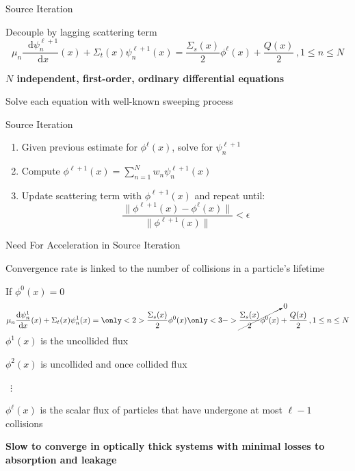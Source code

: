 \documentclass[10pt]{beamer}
\newcommand{\ud}{\mathop{}\!\mathrm{d}} %
\newcommand{\dderiv}[2]{\frac{\ud #1}{\ud #2}}
\begin{document}
\begin{frame}{Source Iteration}

    Decouple by lagging scattering term 
    \begin{equation*}
        \mu_n \dderiv{\psi_n^{\ell+1}}{x}(x) + \Sigma_t(x) \psi_n^{\ell+1}(x) = 
        \frac{\Sigma_s(x)}{2} \phi^{\ell}(x) + \frac{Q(x)}{2} \,, 1 \leq n \leq N        
    \end{equation*}

    \textbf{$N$ independent, first-order, ordinary differential equations}

    Solve each equation with well-known sweeping process 

    \begin{exampleblock}{Source Iteration}
    \begin{enumerate}
        \item Given previous estimate for $\phi^{\ell}(x)$, solve for $\psi_n^{\ell+1}$

        \item Compute $\phi^{\ell+1}(x) = 
            \sum_{n=1}^N w_n \psi_n^{\ell+1}(x)$ 

        \item Update scattering term with $\phi^{\ell+1}(x)$ and repeat until: 
             \begin{equation*}
                \frac{\|\phi^{\ell+1}(x) - \phi^{\ell}(x)\|}{\|\phi^{\ell+1}(x)\|} < \epsilon 
             \end{equation*}

    \end{enumerate}
    \end{exampleblock}

\end{frame}

\begin{frame}{Need For Acceleration in Source Iteration}

	Convergence rate is linked to the number of collisions in a particle's lifetime

    If $\phi^0(x) = 0$
    \begin{equation*}
        \mu_n \dderiv{\psi_n^{1}}{x}(x) + \Sigma_t(x) \psi_n^{1}(x) =
        \vphantom{\cancelto{0}{\frac{\Sigma_s(x)}{2} \phi^{0}(x)}} 
        \only<2>{\frac{\Sigma_s(x)}{2} \phi^{0}(x)}
        \only<3->{\cancelto{0}{\frac{\Sigma_s(x)}{2} \phi^{0}(x)}}
         + \frac{Q(x)}{2} \,, 1 \leq n \leq N 
    \end{equation*}
    $\phi^1(x) $ is the uncollided flux 

    $\phi^2(x)$ is uncollided and once collided flux 

    \ $\vdots$

    $\phi^{\ell}(x)$ is the scalar flux of particles that have undergone at most $\ell - 1$ collisions 

    \textbf{Slow to converge in optically thick systems with minimal losses to absorption and leakage}

\end{frame}
\end{document}
